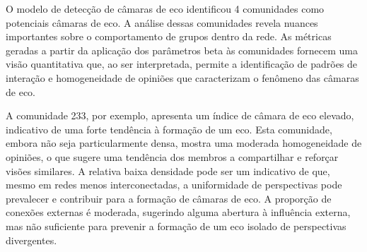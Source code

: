 \begin{table}[ht]
	\centering
	\caption{Resumo das Métricas de Câmaras de Eco das Comunidades em Santo André}
	\label{tab:community-metrics-santo-andre}
\end{table}

O modelo de detecção de câmaras de eco identificou 4 comunidades como potenciais câmaras de eco. A análise dessas comunidades revela nuances importantes sobre o comportamento de grupos dentro da rede. As métricas geradas a partir da aplicação dos parâmetros beta às comunidades fornecem uma visão quantitativa que, ao ser interpretada, permite a identificação de padrões de interação e homogeneidade de opiniões que caracterizam o fenômeno das câmaras de eco.

A comunidade 233, por exemplo, apresenta um índice de câmara de eco elevado, indicativo de uma forte tendência à formação de um eco. Esta comunidade, embora não seja particularmente densa, mostra uma moderada homogeneidade de opiniões, o que sugere uma tendência dos membros a compartilhar e reforçar visões similares. A relativa baixa densidade pode ser um indicativo de que, mesmo em redes menos interconectadas, a uniformidade de perspectivas pode prevalecer e contribuir para a formação de câmaras de eco. A proporção de conexões externas é moderada, sugerindo alguma abertura à influência externa, mas não suficiente para prevenir a formação de um eco isolado de perspectivas divergentes.

